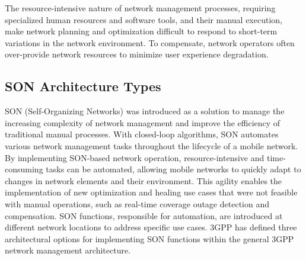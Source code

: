  The resource-intensive nature of network management processes, requiring specialized human resources and software tools, and their manual execution, make network planning and optimization difficult to respond to short-term variations in the network environment. To compensate, network operators often over-provide network resources to minimize user experience degradation.

\subsection{SON Architecture Types}
SON (Self-Organizing Networks) was introduced as a solution to manage the increasing complexity of network management and improve the efficiency of traditional manual processes. With closed-loop algorithms, SON automates various network management tasks throughout the lifecycle of a mobile network.
By implementing SON-based network operation, resource-intensive and time-consuming tasks can be automated, allowing mobile networks to quickly adapt to changes in network elements and their environment. This agility enables the implementation of new optimization and healing use cases that were not feasible with manual operations, such as real-time coverage outage detection and compensation.
SON functions, responsible for automation, are introduced at different network locations to address specific use cases. 3GPP has defined three architectural options for implementing SON functions within the general 3GPP network management architecture.

